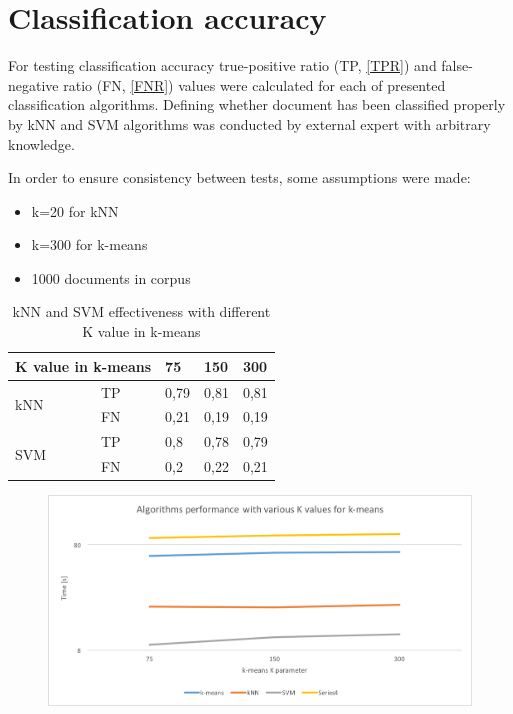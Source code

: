 \section{Classification accuracy} \label{classification-accuracy}

For testing classification accuracy true-positive ratio (TP, \ref{TPR}) and false-negative ratio (FN, \ref{FNR}) values were calculated for each of presented classification algorithms. Defining whether document has been classified properly by kNN and SVM algorithms was conducted by external expert with arbitrary knowledge.

In order to ensure consistency between tests, some assumptions were made:

\begin{itemize}
	\item k=20 for kNN
	\item k=300 for k-means
	\item 1000 documents in corpus
\end{itemize}

\begin{table}[H]
	\centering
	\caption{kNN and SVM effectiveness with different K value in k-means}
	\label{tests:param:kmeans}
	\begin{tabular}{@{}lllll@{}}
		\toprule
		\multicolumn{2}{l}{K value in k-means}     & 75   & 150  & 300  \\ \midrule
		\multirow{2}{*}{kNN} & TP & 0,79 & 0,81 & 0,81 \\
		& FN & 0,21 & 0,19 & 0,19 \\
		\multirow{2}{*}{SVM} & TP & 0,8  & 0,78 & 0,79 \\
		& FN & 0,2  & 0,22 & 0,21 \\ \bottomrule
	\end{tabular}
\end{table}

\begin{figure}[H]
	\begin{center}
		\includegraphics[width=0.9\linewidth]{images/tests/param-kmeans.png}
		\caption{ }
		\label{param-kmeans}
	\end{center}
\end{figure}

